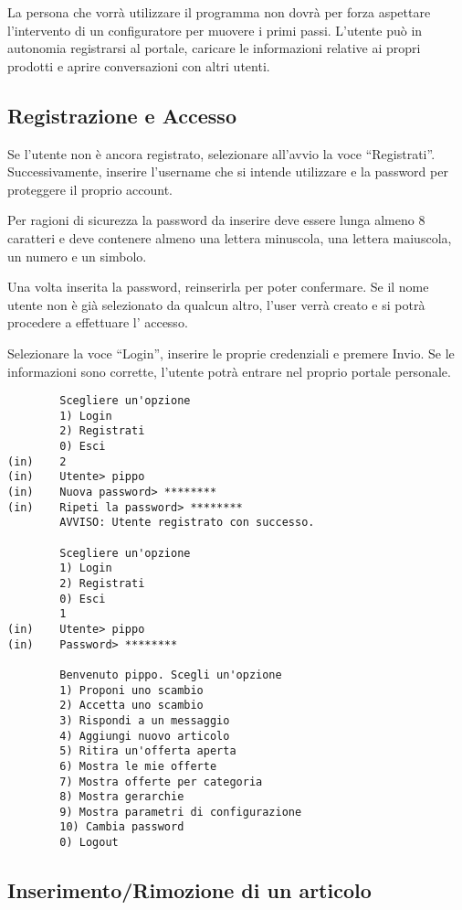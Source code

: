 La persona che vorrà utilizzare il programma non dovrà per forza aspettare l'intervento di un configuratore per muovere i primi passi. L'utente può in autonomia registrarsi al portale, caricare le informazioni relative ai propri prodotti e aprire conversazioni con altri utenti.

\subsection{Registrazione e Accesso}

Se l'utente non è ancora registrato, selezionare all'avvio la voce ``Registrati''. Successivamente, inserire l'username che si intende utilizzare e la password per proteggere il proprio account.

Per ragioni di sicurezza la password da inserire deve essere lunga almeno 8 caratteri e deve contenere almeno una lettera minuscola, una lettera maiuscola, un numero e un simbolo.

Una volta inserita la password, reinserirla per poter confermare. Se il nome utente non è già selezionato da qualcun altro, l'user verrà creato e si potrà procedere a effettuare l' accesso.

Selezionare la voce ``Login'', inserire le proprie credenziali e premere Invio. Se le informazioni sono corrette, l'utente potrà entrare nel proprio portale personale.

\begin{lstlisting}
        Scegliere un'opzione
        1) Login
        2) Registrati
        0) Esci
(in)    2
(in)    Utente> pippo
(in)    Nuova password> ********
(in)    Ripeti la password> ********
        AVVISO: Utente registrato con successo.

        Scegliere un'opzione
        1) Login
        2) Registrati
        0) Esci
        1
(in)    Utente> pippo
(in)    Password> ********

        Benvenuto pippo. Scegli un'opzione
        1) Proponi uno scambio
        2) Accetta uno scambio
        3) Rispondi a un messaggio
        4) Aggiungi nuovo articolo
        5) Ritira un'offerta aperta
        6) Mostra le mie offerte
        7) Mostra offerte per categoria
        8) Mostra gerarchie
        9) Mostra parametri di configurazione
        10) Cambia password
        0) Logout
\end{lstlisting}

\subsection{Inserimento/Rimozione di un articolo}

